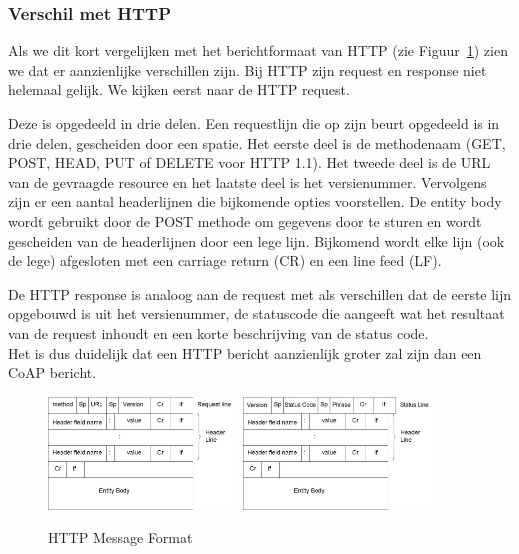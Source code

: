 \newpage

\subsubsection{Verschil met HTTP}

Als we dit kort vergelijken met het berichtformaat van HTTP (zie Figuur~\ref{fig:HTTPMessageFormat}) zien we dat er aanzienlijke verschillen zijn. Bij HTTP zijn request en response niet helemaal gelijk. We kijken eerst naar de HTTP request.

Deze is opgedeeld in drie delen. Een requestlijn die op zijn beurt opgedeeld is in drie delen, gescheiden door een spatie. Het eerste deel is de methodenaam (GET, POST, HEAD, PUT of DELETE voor HTTP 1.1). Het tweede deel is de URL van de gevraagde resource en het laatste deel is het versienummer. Vervolgens zijn er een aantal headerlijnen die bijkomende opties voorstellen. De entity body wordt gebruikt door de POST methode om gegevens door te sturen en wordt gescheiden van de headerlijnen door een lege lijn. Bijkomend wordt elke lijn (ook de lege) afgesloten met een carriage return (CR) en een line feed (LF).

De HTTP response is analoog aan de request met als verschillen dat de eerste lijn opgebouwd is uit het versienummer, de statuscode die aangeeft wat het resultaat van de request inhoudt en een korte beschrijving van de status code.\\
Het is dus duidelijk dat een HTTP bericht aanzienlijk groter zal zijn dan een CoAP bericht.

\begin{figure}[h]
\vspace{10pt}
\centering
{}
{\includegraphics[width=0.45\textwidth]{fig/HTTPRequestMessageFormat}}
{\includegraphics[width=0.45\textwidth]{fig/HTTPResponseMessageFormat}}
\caption{HTTP Message Format}\label{fig:HTTPMessageFormat}
\end{figure}

